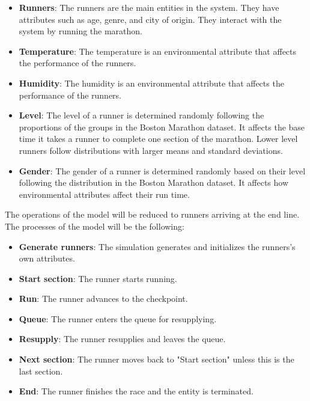 \documentclass[conference]{IEEEtran}
\begin{document}
\begin{itemize}
    \item \textbf{Runners}: The runners are the main entities in the system. They have attributes such as age, genre, and city of origin. They interact with the system by running the marathon.
    \item \textbf{Temperature}: The temperature is an environmental attribute that affects the performance of the runners.
    \item \textbf{Humidity}: The humidity is an environmental attribute that affects the performance of the runners.
    \item \textbf{Level}: The level of a runner is determined randomly following the proportions of the groups in the Boston Marathon dataset. It affects the base time it takes a runner to complete one section of the marathon. Lower level runners follow distributions with larger means and standard deviations.
    \item \textbf{Gender}: The gender of a runner is determined randomly based on their level following the distribution in the Boston Marathon dataset. It affects how environmental attributes affect their run time.
\end{itemize}

The operations of the model will be reduced to runners arriving at the end line. The processes of the model will be the following:
\begin{itemize}
    \item \textbf{Generate runners}: The simulation generates and initializes the runners's own attributes.
    \item \textbf{Start section}: The runner starts running.
    \item \textbf{Run}: The runner advances to the checkpoint.
    \item \textbf{Queue}: The runner enters the queue for resupplying.
    \item \textbf{Resupply}: The runner resupplies and leaves the queue.
    \item \textbf{Next section}: The runner moves back to "Start section" unless this is the last section.
    \item \textbf{End}: The runner finishes the race and the entity is terminated.
\end{itemize}
\end{document}
